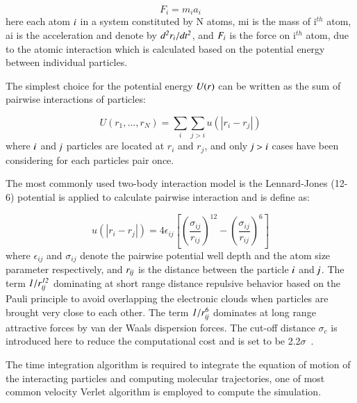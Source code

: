 \documentclass[preprint,12pt]{elsarticle}
\begin{document}
\vspace{-.2em}
\begin{equation}
F_{i} = m_{i}a_{i}
\label{eq:Newton}
\end{equation}
\normalsize
here each atom $\it i $ in a system constituted by N atoms, mi is the mass of i$^{th}$ atom, ai is the acceleration and denote by $\it {d^2r_{i}} / {dt^2}$, and $\it F_{i}$ is the force on i$^{th}$ atom, due to the atomic interaction which is calculated based on the potential energy between individual particles.

The simplest choice for the potential energy $\it U(r)$  can be written as the sum of pairwise interactions of particles:

\vspace{-.2em}
\begin{equation}
U(r_{1}, ...  ,r_{N}) =  \displaystyle\sum_{i} \displaystyle\sum_{j>i}  u(|r_{i} - r_{j}|)
\label{eq:PEnergy}
\end{equation}
\normalsize
where $\it i$ and $\it j$ particles are located at $r_{i}$ and $r_{j}$, and only $\it j>i$ cases have been considering for each particles pair once.

The most commonly used two-body interaction model is the Lennard-Jones (12-6) potential is applied to calculate pairwise interaction and is define as:

\vspace{-.2em}
\begin{equation}
 u(|r_{i} - r_{j}|) = 4\epsilon_{ij}[(\frac{\sigma_{ij}}{r_{ij}})^{12}-(\frac{\sigma_{ij}}{r_{ij}})^{6}]
 \label{eq:LJ12}
\end{equation}
\normalsize
where $\epsilon_{ij}$ and $\sigma_{ij}$ denote the pairwise potential well depth and the atom size parameter respectively, and $\it r_{ij}$ is the distance between the particle $\it i$ and $\it j$. The term $\it 1/r_{ij}^{12}$ dominating at short range distance repulsive behavior based on the Pauli principle to avoid overlapping the electronic clouds when particles are  brought very close to each other. The term $\it 1/r_{ij}^6$ dominates at long range attractive forces by van der Waals dispersion forces. The cut-off distance $\sigma_{c}$ is introduced here to reduce the computational cost and is set to be 2.2$\sigma$~\cite{Travis}.

The time integration algorithm is required to integrate the equation of motion of the interacting particles and computing molecular trajectories, one of most common velocity Verlet algorithm is employed to compute the simulation.
\end{document}

